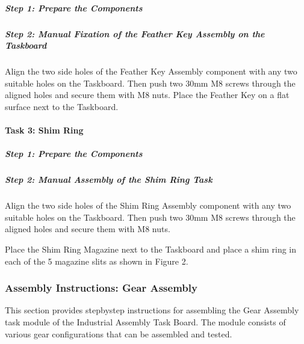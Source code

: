 \documentclass[letterpaper,10pt,english]{sphinxmanual}
\let\sphinxpxdimen\pdfpxdimen\else\newdimen\sphinxpxdimen
\begin{document}
\subparagraph{Step 1: Prepare the Components}
\label{\detokenize{2-Assembly-Instructions-Pick-and-Place:id1}}

\subparagraph{Step 2: Manual Fixation of the Feather Key Assembly on the Taskboard}
\label{\detokenize{2-Assembly-Instructions-Pick-and-Place:step-2-manual-fixation-of-the-feather-key-assembly-on-the-taskboard}}
\sphinxAtStartPar
Align the two side holes of the Feather Key Assembly component with any two suitable holes on the Taskboard. Then push two 30mm M8 screws through the aligned holes and secure them with M8 nuts.
Place the Feather Key on a flat surface next to the Taskboard.


\paragraph{Task 3: Shim Ring}
\label{\detokenize{2-Assembly-Instructions-Pick-and-Place:task-3-shim-ring}}

\subparagraph{Step 1: Prepare the Components}
\label{\detokenize{2-Assembly-Instructions-Pick-and-Place:id2}}

\subparagraph{Step 2: Manual Assembly of the Shim Ring Task}
\label{\detokenize{2-Assembly-Instructions-Pick-and-Place:step-2-manual-assembly-of-the-shim-ring-task}}
\sphinxAtStartPar
Align the two side holes of the Shim Ring Assembly component with any two suitable holes on the Taskboard. Then push two 30mm M8 screws through the aligned holes and secure them with M8 nuts.

\noindent{\hspace*{\fill}\sphinxincludegraphics[width=400\sphinxpxdimen]{{shim_ring_assembly_placement}.png}\hspace*{\fill}}

\sphinxAtStartPar
Place the Shim Ring Magazine next to the Taskboard and place a shim ring in each of the 5 magazine slits as shown in Figure 2.

\sphinxstepscope


\subsubsection{Assembly Instructions: Gear Assembly}
\label{\detokenize{3-Assembly-Instructions-Gear-Assembly:assembly-instructions-gear-assembly}}\label{\detokenize{3-Assembly-Instructions-Gear-Assembly::doc}}
\sphinxAtStartPar
This section provides step\sphinxhyphen{}by\sphinxhyphen{}step instructions for assembling the Gear Assembly task module of the Industrial Assembly Task Board.
The module consists of various gear configurations that can be assembled and tested.
\end{document}
